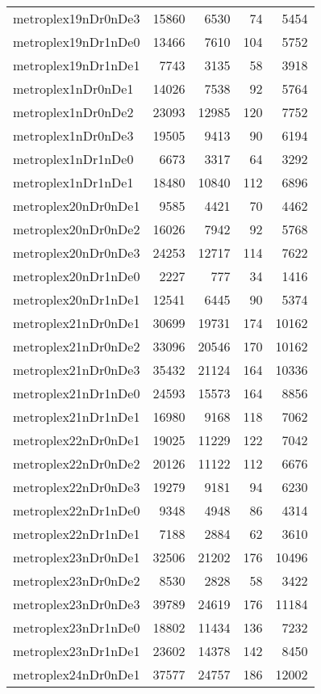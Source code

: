 \begin{longtable}{lrrrr}
metroplex19nDr0nDe3 & 15860 & 6530 & 74 & 5454 \\
metroplex19nDr1nDe0 & 13466 & 7610 & 104 & 5752 \\
metroplex19nDr1nDe1 & 7743 & 3135 & 58 & 3918 \\
metroplex1nDr0nDe1 & 14026 & 7538 & 92 & 5764 \\
metroplex1nDr0nDe2 & 23093 & 12985 & 120 & 7752 \\
metroplex1nDr0nDe3 & 19505 & 9413 & 90 & 6194 \\
metroplex1nDr1nDe0 & 6673 & 3317 & 64 & 3292 \\
metroplex1nDr1nDe1 & 18480 & 10840 & 112 & 6896 \\
metroplex20nDr0nDe1 & 9585 & 4421 & 70 & 4462 \\
metroplex20nDr0nDe2 & 16026 & 7942 & 92 & 5768 \\
metroplex20nDr0nDe3 & 24253 & 12717 & 114 & 7622 \\
metroplex20nDr1nDe0 & 2227 & 777 & 34 & 1416 \\
metroplex20nDr1nDe1 & 12541 & 6445 & 90 & 5374 \\
metroplex21nDr0nDe1 & 30699 & 19731 & 174 & 10162 \\
metroplex21nDr0nDe2 & 33096 & 20546 & 170 & 10162 \\
metroplex21nDr0nDe3 & 35432 & 21124 & 164 & 10336 \\
metroplex21nDr1nDe0 & 24593 & 15573 & 164 & 8856 \\
metroplex21nDr1nDe1 & 16980 & 9168 & 118 & 7062 \\
metroplex22nDr0nDe1 & 19025 & 11229 & 122 & 7042 \\
metroplex22nDr0nDe2 & 20126 & 11122 & 112 & 6676 \\
metroplex22nDr0nDe3 & 19279 & 9181 & 94 & 6230 \\
metroplex22nDr1nDe0 & 9348 & 4948 & 86 & 4314 \\
metroplex22nDr1nDe1 & 7188 & 2884 & 62 & 3610 \\
metroplex23nDr0nDe1 & 32506 & 21202 & 176 & 10496 \\
metroplex23nDr0nDe2 & 8530 & 2828 & 58 & 3422 \\
metroplex23nDr0nDe3 & 39789 & 24619 & 176 & 11184 \\
metroplex23nDr1nDe0 & 18802 & 11434 & 136 & 7232 \\
metroplex23nDr1nDe1 & 23602 & 14378 & 142 & 8450 \\
metroplex24nDr0nDe1 & 37577 & 24757 & 186 & 12002 \\

\end{longtable}
